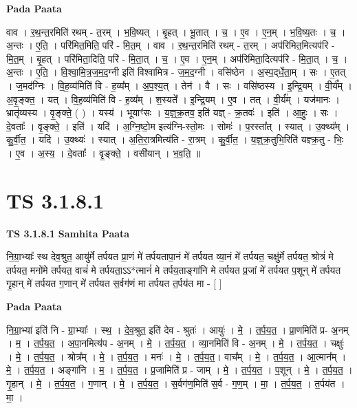 \documentclass[17pt]{extarticle}
\begin{document}
\textbf{Pada Paata} \newline

वाव । र॒थ॒न्त॒रमिति॑ रथम् - त॒रम् । भ॒वि॒ष्यत् । बृ॒हत् । भू॒तात् । च॒ । ए॒व । ए॒न॒म् । भ॒वि॒ष्य॒तः । च॒ । अ॒न्तः । ए॒ति॒ । परि॑मित॒मिति॒ परि॑ - मि॒त॒म् । वाव । र॒थ॒न्त॒रमिति॑ रथम् - त॒रम् । अप॑रिमित॒मित्यप॑रि - मि॒त॒म् । बृ॒हत् । परि॑मिता॒दिति॒ परि॑ - मि॒ता॒त् । च॒ । ए॒व । ए॒न॒म् । अप॑रिमिता॒दित्यप॑रि - मि॒ता॒त् । च॒ । अ॒न्तः । ए॒ति॒ । वि॒श्वा॒मि॒त्र॒ज॒म॒द॒ग्नी इति॑ विश्वामित्र - ज॒म॒द॒ग्नी । वसि॑ष्ठेन । अ॒स्प॒द्‌र्धे॒ता॒म् । सः । ए॒तत् । ज॒मद॑ग्निः । वि॒ह॒व्य॑मिति॑ वि - ह॒व्य᳚म् । अ॒प॒श्य॒त् । तेन॑ । वै । सः । वसि॑ष्ठस्य । इ॒न्द्रि॒यम् । वी॒र्य᳚म् । अ॒वृ॒ङ्क्त॒ । यत् । वि॒ह॒व्य॑मिति॑ वि - ह॒व्य᳚म् । श॒स्यते᳚ । इ॒न्द्रि॒यम् । ए॒व । तत् । वी॒र्य᳚म् । यज॑मानः । भ्रातृ॑व्यस्य । वृ॒ङ्क्ते॒ ( ) । यस्य॑ । भूयाꣳ॑सः । य॒ज्ञ्॒क्र॒तव॒ इति॑ यज्ञ् - क्र॒तवः॑ । इति॑ । आ॒हुः॒ । सः । दे॒वताः᳚ । वृ॒ङ्क्ते॒ । इति॑ । यदि॑ । अ॒ग्नि॒ष्टो॒म इत्य॑ग्नि-स्तो॒मः । सोमः॑ । प॒रस्ता᳚त् । स्यात् । उ॒क्थ्य᳚म् । कु॒र्वी॒त॒ । यदि॑ । उ॒क्थ्यः॑ । स्यात् । अ॒ति॒रा॒त्रमित्य॑ति - रा॒त्रम् । कु॒र्वी॒त॒ । य॒ज्ञ्॒क्र॒तुभि॒रिति॑ यज्ञ्क्र॒तु - भिः॒ । ए॒व । अ॒स्य॒ । दे॒वताः᳚ । वृ॒ङ्क्ते॒ । वसी॑यान् । भ॒व॒ति॒ ॥  \newline




\section*{ TS 3.1.8.1 }

\textbf{TS 3.1.8.1 } \newline
\textbf{Samhita Paata} \newline

नि॒ग्रा॒भ्याः᳚ स्थ देव॒श्रुत॒ आयु॑र्मे तर्पयत प्रा॒णं मे॑ तर्पयतापा॒नं मे॑ तर्पयत व्या॒नं मे॑ तर्पयत॒ चक्षु॑र्मे तर्पयत॒ श्रोत्रं॑ मे तर्पयत॒ मनो॑मे तर्पयत॒ वाचं॑ मे तर्पयता॒ऽऽ*त्मानं॑ मे तर्पय॒ताङ्गा॑नि मे तर्पयत प्र॒जां मे॑ तर्पयत प॒शून् मे॑ तर्पयत गृ॒हान् मे॑ तर्पयत ग॒णान् मे॑ तर्पयत स॒र्वग॑णं मा तर्पयत त॒र्पय॑त मा - [  ] \newline

\textbf{Pada Paata} \newline

नि॒ग्रा॒भ्या॑ इति॑ नि - ग्रा॒भ्याः᳚ । स्थ॒ । दे॒व॒श्रुत॒ इति॑ देव - श्रुतः॑ । आयुः॑ । मे॒ । त॒र्प॒य॒त॒ । प्रा॒णमिति॑ प्र- अ॒नम् । म॒ । त॒र्प॒य॒त॒ । अ॒पा॒नमित्य॑प - अ॒नम् । मे॒ । त॒र्प॒य॒त॒ । व्या॒नमिति॑ वि - अ॒नम् । मे॒ । त॒र्प॒य॒त॒ । चक्षुः॑ । मे॒ । त॒र्प॒य॒त॒ । श्रोत्र᳚म् । मे॒ । त॒र्प॒य॒त॒ । मनः॑ । मे॒ । त॒र्प॒य॒त॒। वाच᳚म् । मे॒ । त॒र्प॒य॒त॒ । आ॒त्मान᳚म् । मे॒ । त॒र्प॒य॒त॒ । अङ्गा॑नि । म॒ । त॒र्प॒य॒त॒ । प्र॒जामिति॑ प्र - जाम् । मे॒ । त॒र्प॒य॒त॒ । प॒शून् । मे॒ । त॒र्प॒य॒त॒ । गृ॒हान् । मे॒ । त॒र्प॒य॒त॒ । ग॒णान् । मे॒ । त॒र्प॒य॒त॒ । स॒र्वग॑ण॒मिति॑ स॒र्व - ग॒ण॒म् । मा॒ । त॒र्प॒य॒त॒ । त॒र्पय॑त । मा॒ ।  \newline
\end{document}
